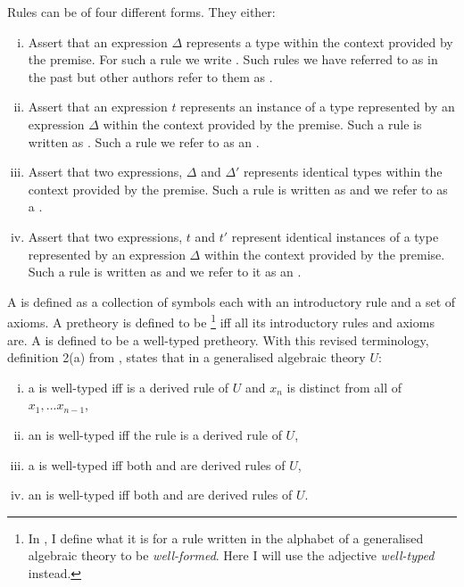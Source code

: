 Rules can be of four different forms. They either:

\begin{enumerate}[(i)]
\item Assert that an expression $\Delta$ represents a type within the context provided by the premise. For such a rule we write
. Such rules we have referred to as  \Trules in the past but other authors refer to them as .

\item Assert that an expression $t$ represents an instance of a type represented by an expression $\Delta$ within the context provided by the premise. Such a rule is written as
. Such a rule we refer to as an \trule.

\item Assert that two expressions, $\Delta$ and $\Delta'$ represents identical types within the context provided by the premise. Such a rule is written as 
 and we refer to as a \Teqrule.

\item Assert that two expressions, $t$ and $t'$ represent identical instances of a type represented by an expression $\Delta$  within the context provided by the premise. Such a rule is written as 
 and we  refer to it as an \teqrule.
\end{enumerate}


A  is defined as a collection of symbols each with an introductory rule and a set of axioms. A pretheory is defined to be \footnote{In \cite{Cartmell86}, I define what it is for a rule written in the alphabet of a generalised algebraic theory to be \textit{well-formed}. Here I will use the adjective \textit{well-typed} instead.} iff all its introductory rules and axioms are. A  is defined to be a well-typed pretheory. 
With this revised terminology, definition 2(a) from \cite{Cartmell86}, states that in  a generalised algebraic theory $U$:
\begin{enumerate} [(i)]
\item 
a \Trule {} is well-typed  iff 
 is a derived rule of $U$ and $x_n$ is distinct from all of $x_1,...x_{n-1}$, 
\item 
an \trule {} is well-typed iff
the rule  is a derived rule of $U$,
\item 
a \Teqrule {} is well-typed iff
both  and  are derived rules
of $U$,
\item 
an \teqrule {} is well-typed iff
both  and  are derived rules
of $U$.
\end{enumerate}




